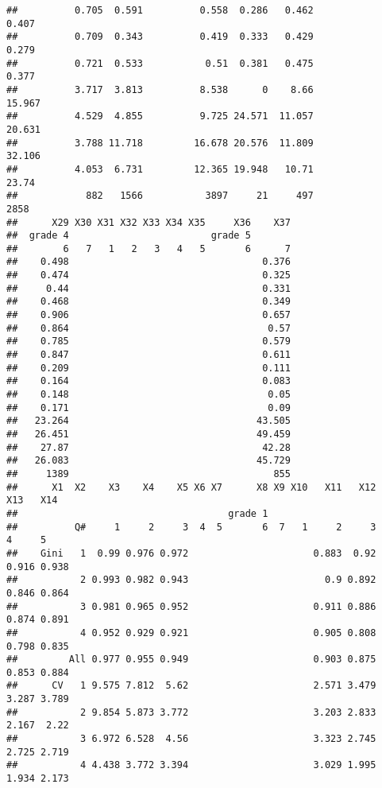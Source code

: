 \documentclass[
]{article}
\begin{document}
\begin{verbatim}
##          0.705  0.591          0.558  0.286   0.462                      0.407
##          0.709  0.343          0.419  0.333   0.429                      0.279
##          0.721  0.533           0.51  0.381   0.475                      0.377
##          3.717  3.813          8.538      0    8.66                     15.967
##          4.529  4.855          9.725 24.571  11.057                     20.631
##          3.788 11.718         16.678 20.576  11.809                     32.106
##          4.053  6.731         12.365 19.948   10.71                      23.74
##            882   1566           3897     21     497                       2858
##      X29 X30 X31 X32 X33 X34 X35     X36    X37
##  grade 4                         grade 5       
##        6   7   1   2   3   4   5       6      7
##    0.498                                  0.376
##    0.474                                  0.325
##     0.44                                  0.331
##    0.468                                  0.349
##    0.906                                  0.657
##    0.864                                   0.57
##    0.785                                  0.579
##    0.847                                  0.611
##    0.209                                  0.111
##    0.164                                  0.083
##    0.148                                   0.05
##    0.171                                   0.09
##   23.264                                 43.505
##   26.451                                 49.459
##    27.87                                  42.28
##   26.083                                 45.729
##     1389                                    855
##      X1  X2    X3    X4    X5 X6 X7      X8 X9 X10   X11   X12   X13   X14
##                                     grade 1                               
##          Q#     1     2     3  4  5       6  7   1     2     3     4     5
##    Gini   1  0.99 0.976 0.972                      0.883  0.92 0.916 0.938
##           2 0.993 0.982 0.943                        0.9 0.892 0.846 0.864
##           3 0.981 0.965 0.952                      0.911 0.886 0.874 0.891
##           4 0.952 0.929 0.921                      0.905 0.808 0.798 0.835
##         All 0.977 0.955 0.949                      0.903 0.875 0.853 0.884
##      CV   1 9.575 7.812  5.62                      2.571 3.479 3.287 3.789
##           2 9.854 5.873 3.772                      3.203 2.833 2.167  2.22
##           3 6.972 6.528  4.56                      3.323 2.745 2.725 2.719
##           4 4.438 3.772 3.394                      3.029 1.995 1.934 2.173

\end{verbatim}
\end{document}
